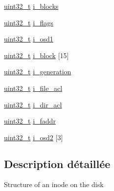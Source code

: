 \begin{DoxyCompactItemize}
\item 
\hyperlink{kernel_2include_2types_8h_a33594304e786b158f3fb30289278f5af}{uint32\+\_\+t} \hyperlink{structext2__inode_a6e5b258ebc92b6ae75c61572c60cbb4b}{i\+\_\+blocks}
\item 
\hyperlink{kernel_2include_2types_8h_a33594304e786b158f3fb30289278f5af}{uint32\+\_\+t} \hyperlink{structext2__inode_a2037da1edbe1d421dd4453f84cb973e6}{i\+\_\+flags}
\item 
\hyperlink{kernel_2include_2types_8h_a33594304e786b158f3fb30289278f5af}{uint32\+\_\+t} \hyperlink{structext2__inode_ab06178218f59df43b3d80ad53edc6105}{i\+\_\+osd1}
\item 
\hyperlink{kernel_2include_2types_8h_a33594304e786b158f3fb30289278f5af}{uint32\+\_\+t} \hyperlink{structext2__inode_a3e2386992eeb6a3b6aa5e282c50221c7}{i\+\_\+block} \mbox{[}15\mbox{]}
\item 
\hyperlink{kernel_2include_2types_8h_a33594304e786b158f3fb30289278f5af}{uint32\+\_\+t} \hyperlink{structext2__inode_a551df9f3b8f61eb5840eeeb5921c69fb}{i\+\_\+generation}
\item 
\hyperlink{kernel_2include_2types_8h_a33594304e786b158f3fb30289278f5af}{uint32\+\_\+t} \hyperlink{structext2__inode_aee0fba48998e7d27b836d04ee53e4463}{i\+\_\+file\+\_\+acl}
\item 
\hyperlink{kernel_2include_2types_8h_a33594304e786b158f3fb30289278f5af}{uint32\+\_\+t} \hyperlink{structext2__inode_a11c2793c33c6ce3f13a5f046e246fd47}{i\+\_\+dir\+\_\+acl}
\item 
\hyperlink{kernel_2include_2types_8h_a33594304e786b158f3fb30289278f5af}{uint32\+\_\+t} \hyperlink{structext2__inode_a3c921d50835f4869a08444b7e8b01043}{i\+\_\+faddr}
\item 
\hyperlink{kernel_2include_2types_8h_a33594304e786b158f3fb30289278f5af}{uint32\+\_\+t} \hyperlink{structext2__inode_a6f05264ef1f6a42a6975a858d1aa17c3}{i\+\_\+osd2} \mbox{[}3\mbox{]}
\end{DoxyCompactItemize}


\subsection{Description détaillée}
Structure of an inode on the disk 

